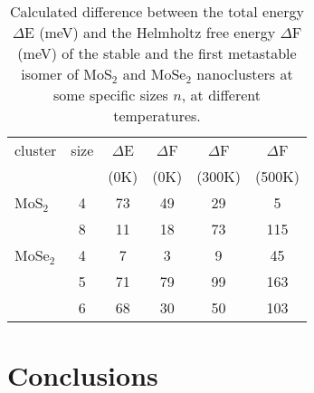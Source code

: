\documentclass[nofootinbib,10pt,aip,twocolumn,showpacs]{revtex4-1}
\begin{document}
\begin{table}
\caption{\label{transition}
 Calculated difference between the total energy $\Delta$E (meV)
 and the Helmholtz free energy $\Delta$F (meV) of the stable 
 and the first metastable isomer of MoS$_{2}$ and MoSe$_{2}$ nanoclusters
 at some specific sizes $n$, at different temperatures.}
\begin{ruledtabular} 
\begin{tabular}{lccccc} 
cluster  & size & $\Delta$E & $\Delta$F & $\Delta$F & $\Delta$F \\ 
         &      &    (0K)   &   (0K)    &   (300K)  &   (500K)  \\ \hline 
MoS$_2$  &   4  &     73    &    49     &     29    &      5    \\ 
         &   8  &     11    &    18     &     73    &    115    \\
MoSe$_2$ &   4  &     7     &     3     &      9    &     45    \\ 
         &   5  &    71     &    79     &     99    &    163    \\ 
         &   6  &    68     &    30     &     50    &    103    \\ 
\end{tabular}
\end{ruledtabular}
\end{table}


\section{Conclusions}
\end{document}
